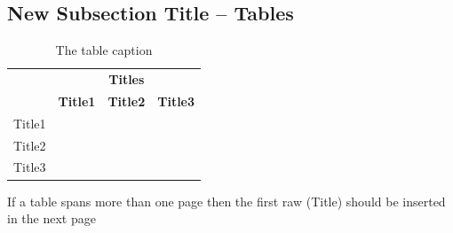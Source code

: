 \subsection{New Subsection Title – Tables}
\begin{justify}





\renewcommand{\arraystretch}{1.5}
\begin{table}[H]
\centering
\caption{The table caption}
\begin{tabular}{|p{2.25cm}|p{1.75cm}|p{1.75cm}|p{7.75cm}|} 
\hline
\rowcolor[rgb]{0.914,0.914,0.914} \multicolumn{1}{|c|}{{\cellcolor[rgb]{0.914,0.914,0.914}}}                                   & \multicolumn{3}{c|}{\textbf{Titles}}                                      \\ 
\hhline{|>{\arrayrulecolor[rgb]{0.914,0.914,0.914}}->{\arrayrulecolor{black}}---|}
\rowcolor[rgb]{0.914,0.914,0.914} \multicolumn{1}{|c|}{\multirow{-2}{*}{{\cellcolor[rgb]{0.914,0.914,0.914}}\textbf{Heading}}} & \textbf{Title1} & \textbf{Title2} & \textbf{Title3}                       \\ 
\hline
{\cellcolor[rgb]{0.914,0.914,0.914}}Title1                                                                                     &                 &                 & {\cellcolor[rgb]{0.965,0.965,0.965}}  \\ 
\hline
{\cellcolor[rgb]{0.914,0.914,0.914}}Title2                                                                                     &                 &                 &                                       \\ 
\hline
{\cellcolor[rgb]{0.914,0.914,0.914}}Title3                                                                                     &                 &                 &                                       \\
\hline
\end{tabular}
\end{table}


    If a table spans more than one page then the first raw (Title) should be inserted in the next page
    
\end{justify}

